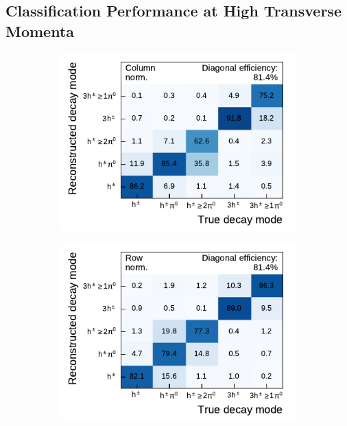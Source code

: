 \clearpage
\subsection{Classification Performance at High Transverse Momenta}
\label{sec:combined_high_pt_migration}

\begin{figure}[htb]
    \begin{subfigure}{0.48\textwidth}
    \centering
    \includegraphics{./figures/decay_mode_classification/highpt/mig_mat_pt_less_100.pdf}
  \end{subfigure}\hfill
  \begin{subfigure}{0.48\textwidth}
    \centering
    \includegraphics{./figures/decay_mode_classification/highpt/comp_mat_pt_less_100.pdf}

\end{subfigure}
\end{figure}
